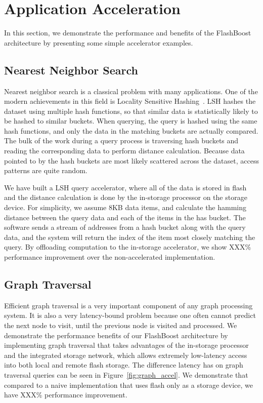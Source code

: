 \section{Application Acceleration}
\label{sec:acceleration}

In this section, we demonstrate the performance and benefits of the FlashBoost
architecture by presenting some simple accelerator examples. 

\subsection{Nearest Neighbor Search}

Nearest neighbor search is a classical problem with many applications. One of
the modern achievements in this field is Locality Sensitive Hashing~\cite{lsh}.
LSH hashes the dataset using multiple hash functions, so that
similar data is statistically likely to be hashed to similar buckets. When
querying, the query is hashed using the same hash functions, and only the data
in the matching buckets are actually compared. The bulk of the work during a
query process is traversing hash buckets and reading the corresponding data to
perform distance calculation. Because data pointed to by the hash buckets are
most likely scattered across the dataset, access patterns are quite random.

We have built a LSH query accelerator, where all of the data is stored in flash
and the distance calculation is done by the in-storage processor on the storage
device. For simplicity, we assume 8KB data items, and calculate the hamming
distance between the query data and each of the items in the has bucket. The
software sends a stream of addresses from a hash bucket along with the query
data, and the system will return the index of the item most closely matching the
query. By offloading computation to the in-storage accelerator, we
show XXX\% performance improvement over the non-accelerated implementation.



\subsection{Graph Traversal}

Efficient graph traversal is a very important component of any graph processing
system. It is also a very latency-bound problem because one often cannot predict
the next node to visit, until the previous node is visited and processed. We
demonstrate the performance benefits of our FlashBoost architecture by
implementing graph traversal that takes advantages of the in-storage processor
and the integrated storage network, which allows extremely low-latency access
into both local and remote flash storage. The difference latency has on graph
traversal queries can be seen in Figure~\ref{fig:graph_accel}. We demonstrate that compared to a
naive implementation that uses flash only as a storage device, we have XXX\%
performance improvement.

